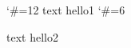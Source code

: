 \documentclass{article}
\begin{document}
\catcode`\#=12
text \tagmcbegin{}hello1\tagmcend{}\tagstructend{}
\catcode`\#=6

text \tagmcbegin{}hello2\tagmcend{}\tagstructend{}
\end{document}
